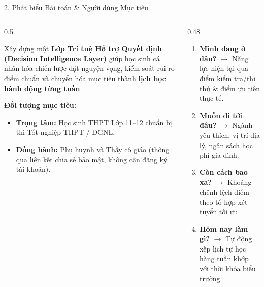 \documentclass[aspectratio=169, 10pt]{beamer}
\begin{document}
\begin{frame}{2. Phát biểu Bài toán \& Người dùng Mục tiêu}
\begin{columns}[T]
  \begin{column}{0.5\textwidth}
    \begin{tcolorbox}[colback=white,colframe=XanhChuDao,title=\textbf{Bài toán (Problem Statement)}]
      Xây dựng một \textbf{Lớp Trí tuệ Hỗ trợ Quyết định (Decision Intelligence Layer)} giúp học sinh cá nhân hóa chiến lược đặt nguyện vọng, kiểm soát rủi ro điểm chuẩn và chuyển hóa mục tiêu thành \textbf{lịch học hành động từng tuần}.
    \end{tcolorbox}
    \vspace{0.2cm}
    \textbf{Đối tượng mục tiêu:}
    \begin{itemize}
      \item \textbf{Trọng tâm:} Học sinh THPT Lớp 11–12 chuẩn bị thi Tốt nghiệp THPT / ĐGNL.
      \item \textbf{Đồng hành:} Phụ huynh và Thầy cô giáo (thông qua liên kết chia sẻ bảo mật, không cần đăng ký tài khoản).
    \end{itemize}
  \end{column}
  
  \begin{column}{0.48\textwidth}
    \begin{tcolorbox}[colback=white,colframe=LucThanhCong,title=\textbf{4 Câu hỏi Cốt lõi Giải quyết Cho Em}]
      \begin{enumerate}
        \item \textbf{Mình đang ở đâu?} $\rightarrow$ Năng lực hiện tại qua điểm kiểm tra/thi thử \& điểm ưu tiên thực tế.
        \item \textbf{Muốn đi tới đâu?} $\rightarrow$ Ngành yêu thích, vị trí địa lý, ngân sách học phí gia đình.
        \item \textbf{Còn cách bao xa?} $\rightarrow$ Khoảng chênh lệch điểm theo tổ hợp xét tuyển tối ưu.
        \item \textbf{Hôm nay làm gì?} $\rightarrow$ Tự động xếp lịch tự học hàng tuần khớp với thời khóa biểu trường.
      \end{enumerate}
    \end{tcolorbox}
  \end{column}
\end{columns}
\end{frame}
\end{document}
